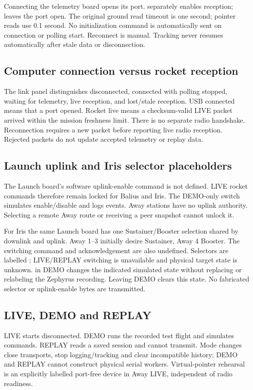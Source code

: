 Connecting the telemetry board opens its port.  separately
enables reception;  leaves the port open. The original ground
read timeout is one second; pointer reads use 0.1 second. No initialization
command is automatically sent on connection or polling start. Reconnect is
manual. Tracking never resumes automatically after stale data or disconnection.

\subsection{Computer connection versus rocket reception}
The link panel distinguishes disconnected, connected with polling stopped,
waiting for telemetry, live reception, and lost/stale reception. USB connected
means that a port opened. Rocket live means a checksum-valid LIVE packet arrived
within the mission freshness limit. There is no separate radio handshake.
Reconnection requires a new packet before reporting live radio reception.
Rejected packets do not update accepted telemetry or replay data.

\subsection{Launch uplink and Iris selector placeholders}
The Launch board's software uplink-enable command is not defined. LIVE rocket
commands therefore remain locked for Balius and Iris. The DEMO-only switch
simulates enable/disable and logs events. Away stations have no uplink authority.
Selecting a remote Away route or receiving a peer snapshot cannot unlock it.

For Iris the same Launch board has one Sustainer/Booster selection shared by
downlink and uplink. Away 1--3 initially desire Sustainer, Away 4 Booster.
The switching command and acknowledgement are also undefined. Selectors are
labelled ; LIVE/REPLAY switching is unavailable and physical
target state is unknown.  in DEMO changes the indicated
simulated state without replacing or relabeling the Zephyrus recording.
Leaving DEMO clears this state. No fabricated selector or uplink-enable bytes
are transmitted.

\subsection{LIVE, DEMO and REPLAY}
LIVE starts disconnected. DEMO runs the recorded test flight and simulates
commands. REPLAY reads a saved session and cannot transmit. Mode changes close
transports, stop logging/tracking and clear incompatible history; DEMO and
REPLAY cannot construct physical serial workers. Virtual-pointer rehearsal is
an explicitly labelled port-free device in Away LIVE, independent of radio
readiness.


